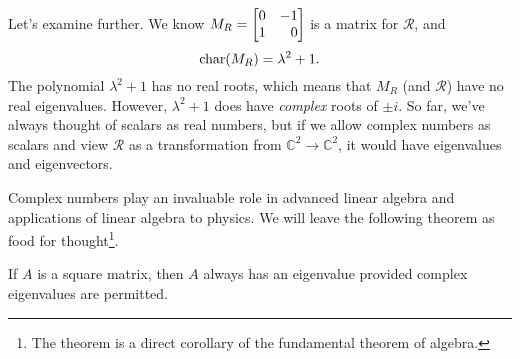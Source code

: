Let's examine further. We know $M_R=\mat{0&-1\\1&0}$ is a matrix for $\mathcal R$,
and
\[
	\operatorname{char}(M_R) = \lambda^2+1.
\]
The polynomial $\lambda^2+1$ has no real roots, which means that $M_R$ (and $\mathcal R$) have
no real eigenvalues. However, $\lambda^2+1$ does have \emph{complex} roots of $\pm i$.
So far, we've always thought of scalars as real numbers, but if we allow complex numbers as
scalars and view $\mathcal R$ as a transformation from $\mathbb C^2\to\mathbb C^2$, it would have eigenvalues
and eigenvectors.

Complex numbers play an invaluable role in advanced linear algebra and applications of linear
algebra to physics. We will leave the following theorem as food for thought\footnote{ The theorem
is a direct corollary of the fundamental theorem of algebra.}.

\begin{theorem}
	If $A$ is a square matrix, then $A$ always has an eigenvalue provided complex eigenvalues are permitted.
\end{theorem}

